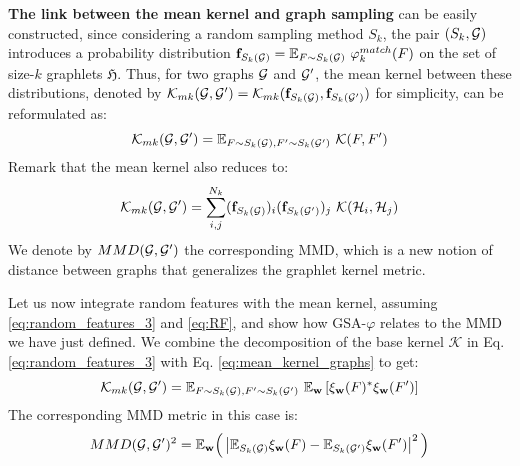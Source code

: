 \textbf{The link between the mean kernel and graph sampling} can be easily constructed, since considering a random sampling method $S_k$, the pair $(S_k , \mathcal{G})$  introduces a probability distribution $\mathbf{f}_{S_k(\mathcal{G})}= \mathbb{E}_{F \sim S_k(\mathcal{G})} ~\varphi^{match}_k(F)$ on the set of size-$k$ graphlets $\mathfrak{H}$. Thus, for two graphs $\mathcal{G}$ and $\mathcal{G}'$, the mean kernel between these distributions, denoted by $\mathcal{K}_{mk}(\mathcal{G},\mathcal{G}')=\mathcal{K}_{mk}(\mathbf{f}_{S_k(\mathcal{G})},\mathbf{f}_{S_k(\mathcal{G}')})$ for simplicity, can be reformulated as:
\begin{equation}
\label{eq:mean_kernel_graphs}
\mathcal{K}_{mk}(\mathcal{G},\mathcal{G}') = \mathbb{E}_{F \sim S_k(\mathcal{G}), F' \sim S_k(\mathcal{G}')} ~\mathcal{K}(F,F')
\end{equation}
Remark that the mean kernel also reduces to:
\[
\mathcal{K}_{mk}(\mathcal{G},\mathcal{G}')=\sum_{i,j}^{N_k}(\mathbf{f}_{S_k(\mathcal{G})})_i(\mathbf{f}_{S_k(\mathcal{G}')})_j~\mathcal{K}(\mathcal{H}_i,\mathcal{H}_j) 
\]
We denote by $MMD(\mathcal{G},\mathcal{G}')$ the corresponding MMD, which is a new notion of distance between graphs that generalizes the graphlet kernel metric.

Let us now integrate random features with the mean kernel, assuming \eqref{eq:random_features_3} and \eqref{eq:RF}, and show how GSA-$\varphi$ relates to the MMD we have just defined. We combine the decomposition of the base kernel $\mathcal{K}$ in Eq. \eqref{eq:random_features_3} with Eq. \eqref{eq:mean_kernel_graphs} to get:
\begin{equation}
    \label{eq:mk_rf}
    \mathcal{K}_{mk}(\mathcal{G},\mathcal{G}')= \mathbb{E}_{F \sim S_k(\mathcal{G}), F' \sim S_k(\mathcal{G}')}~ \mathbb{E}_\mathbf{w} \left[\xi_\mathbf{w}(F)^*\xi_\mathbf{w}(F')\right]
\end{equation}
The corresponding MMD metric in this case is:
\begin{equation}
\label{eq:MMD-RF}
MMD(\mathcal{G},\mathcal{G}')^2 = \mathbb{E}_{\mathbf{w}} \Big( \left| \mathbb{E}_{S_k(\mathcal{G})} \xi_\mathbf{w}(F) - \mathbb{E}_{S_k(\mathcal{G}')} \xi_\mathbf{w}(F') \right|^2 \Big)
\end{equation}

